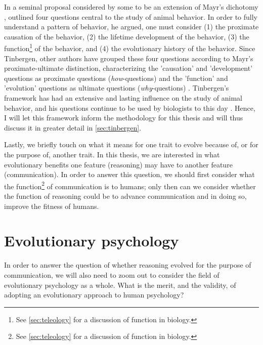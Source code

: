 In a seminal proposal considered by some to be an extension of Mayr's dichotomy \citep{Laland13}, \citet{Tinbergen63} outlined four questions central to the study of animal behavior. In order to fully understand a pattern of behavior, he argued, one must consider (1) the proximate causation of the behavior, (2) the lifetime development of the behavior, (3) the function\footnote{See \cref{sec:teleology} for a discussion of function in biology.} of the behavior, and (4) the evolutionary history of the behavior.
Since Tinbergen, other authors have grouped these four questions according to Mayr's proximate-ultimate distinction, characterizing the 'causation' and 'development' questions as proximate questions (\emph{how}-questions) and the 'function' and 'evolution' questions as ultimate questions (\emph{why}-questions) \citep{BatesonLaland13, Laland13}.
Tinbergen's framework has had an extensive and lasting influence on the study of animal behavior, and his questions continue to be used by biologists to this day \citep{BatesonLaland13}. Hence, I will let this framework inform the methodology for this thesis and will thus discuss it in greater detail in \cref{sec:tinbergen}.


Lastly, we briefly touch on what it means for one trait to evolve because of, or for the purpose of, another trait. In this thesis, we are interested in what evolutionary benefits one feature (reasoning) may have to another feature (communication). In order to answer this question, we should first consider what the function\footnote{See \cref{sec:teleology} for a discussion of function in biology.} of communication is to humans; only then can we consider whether the function of reasoning could be to advance communication and in doing so, improve the fitness of humans.

\section{Evolutionary psychology}
\label{sec:evol-psych}
In order to answer the question of whether reasoning evolved for the purpose of communication, we will also need to zoom out to consider the field of evolutionary psychology as a whole.
What is the merit, and the validity, of adopting an evolutionary approach to human psychology?

